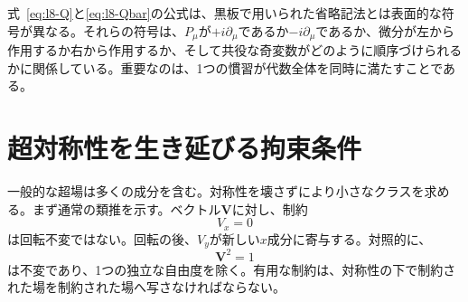\begin{classroomqa}
\end{classroomqa}

\begin{classroomqa}
\end{classroomqa}

\begin{classroomqa}
\end{classroomqa}

式~\eqref{eq:l8-Q}と\eqref{eq:l8-Qbar}の公式は、黒板で用いられた省略記法とは表面的な符号が異なる。それらの符号は、\(P_\mu\)が\(+i\partial_\mu\)であるか\(-i\partial_\mu\)であるか、微分が左から作用するか右から作用するか、そして共役な奇変数がどのように順序づけられるかに関係している。重要なのは、1つの慣習が代数全体を同時に満たすことである。

\section{超対称性を生き延びる拘束条件}

一般的な超場は多くの成分を含む。対称性を壊さずにより小さなクラスを求める。まず通常の類推を示す。ベクトル\(\mathbf V\)に対し、制約
\begin{equation}
V_x=0
\end{equation}
は回転不変ではない。回転の後、\(V_y\)が新しい\(x\)成分に寄与する。対照的に、
\begin{equation}
\mathbf V^2=1
\end{equation}
は不変であり、1つの独立な自由度を除く。有用な制約は、対称性の下で制約された場を制約された場へ写さなければならない。

